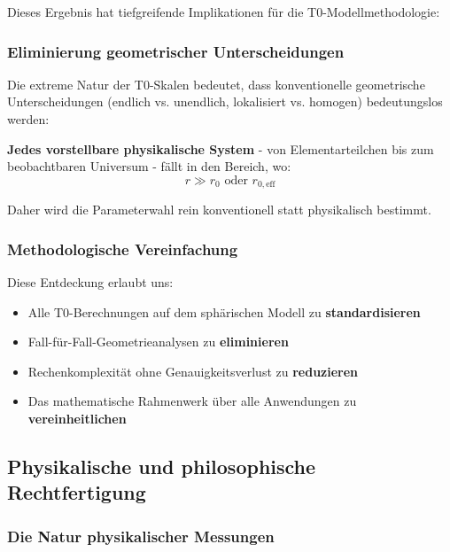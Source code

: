 \documentclass[12pt,a4paper]{article}
\begin{document}
Dieses Ergebnis hat tiefgreifende Implikationen für die T0-Modellmethodologie:

\subsubsection{Eliminierung geometrischer Unterscheidungen}
\label{subsubsec:geometric_distinctions}

Die extreme Natur der T0-Skalen bedeutet, dass konventionelle geometrische Unterscheidungen (endlich vs. unendlich, lokalisiert vs. homogen) bedeutungslos werden:

\textbf{Jedes vorstellbare physikalische System} - von Elementarteilchen bis zum beobachtbaren Universum - fällt in den Bereich, wo:
\begin{equation}
	r \gg r_0 \text{ oder } r_{0,\text{eff}}
\end{equation}

Daher wird die Parameterwahl rein konventionell statt physikalisch bestimmt.

\subsubsection{Methodologische Vereinfachung}
\label{subsubsec:methodological_simplification}

Diese Entdeckung erlaubt uns:
\begin{itemize}
	\item Alle T0-Berechnungen auf dem sphärischen Modell zu \textbf{standardisieren}
	\item Fall-für-Fall-Geometrieanalysen zu \textbf{eliminieren}  
	\item Rechenkomplexität ohne Genauigkeitsverlust zu \textbf{reduzieren}
	\item Das mathematische Rahmenwerk über alle Anwendungen zu \textbf{vereinheitlichen}
\end{itemize}

\subsection{Physikalische und philosophische Rechtfertigung}
\label{subsec:philosophical_justification}

\subsubsection{Die Natur physikalischer Messungen}
\label{subsubsec:nature_physical_measurement}
\end{document}
